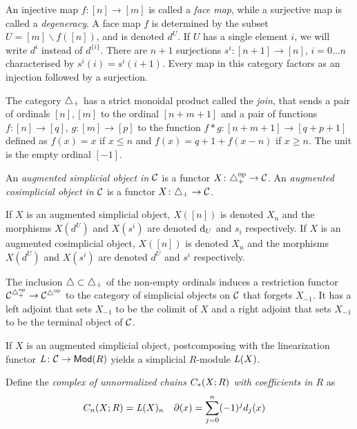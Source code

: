 An injective map $f \colon  [n]\to [m]$ is called a \emph{face map}, while a surjective map is called a \emph{degeneracy}. A face map $f$ is determined by the subset $U = [m]\smallsetminus f([n])$, and is denoted $d^U$. If $U$ has a single element $i$, we will write $d^i$ instead of $d^{\{i\}}$. There are $n+1$ surjections $s^i \colon  [n+1]\to [n]$, $i = 0\ldots n$ characterised by $s^i(i) = s^i(i+1)$. Every map in this category factors as an injection followed by a surjection.

The category $\asimplex$ has a strict monoidal product called the \emph{join}, that sends a pair of ordinals $[n],[m]$ to the ordinal $[n+m+1]$ and a pair of functions $f \colon  [n]\to [q]$, $g \colon  [m]\to [p]$ to the function $f*g \colon  [n+m+1]\to [q+p+1]$ defined as $f(x) = x$ if $x\leq  n$ and $f(x) = q+1+f(x-n)$ if $x\geq n$. The unit is the empty ordinal $[-1]$.

\begin{definition}
	An \emph{augmented simplicial object in $\cC$} is a functor $X \colon  \asimplex^\mathrm{op}\to \cC$.
	An \emph{augmented cosimplicial object in $\cC$} is a functor $X \colon  \asimplex\to \cC$.
\end{definition}

If $X$ is an augmented simplicial object, $X([n])$ is denoted $X_n$ and the morphisms $X(d^U)$ and $X(s^i)$ are denoted $\d_U$ and $s_i$ respectively. If $X$ is an augmented cosimplicial object, $X([n])$ is denoted $X_n$ and the morphisms $X(d^U)$ and $X(s^i)$ are denoted $d^U$ and $s^i$ respectively.

The inclusion $\simplex\subset \asimplex$ of the non-empty ordinals induces a restriction functor $\cC^{\asimplex^{\op}}\to \cC^{\simplex^{\op}}$ to the category of simplicial objects on $\cC$ that forgets $X_{-1}$. It has a left adjoint that sets $X_{-1}$ to be the colimit of $X$ and a right adjoint that sets $X_{-1}$ to be the terminal object of $\cC$.

If $X$ is an augmented simplicial object, postcomposing with the linearization functor $\abel \colon  \cC\to \Mod{R}$ yields a simplicial $R$-module $\abel(X)$.

Define the \emph{complex of unnormalized chains $\ucadenas(X;R)$ with coefficients in $R$} as
\begin{align*}
	\ucadenas[n](X;R) &= \abel(X)_n
	&
	\partial(x) &= \sum_{j=0}^{n} (-1)^jd_j(x)
\end{align*}



